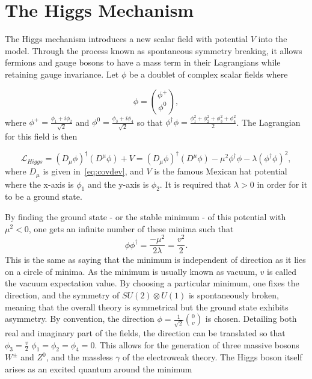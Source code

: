 \section{The Higgs Mechanism}
\label{higgs}
The Higgs mechanism introduces a new scalar field with potential $V$ into the model. Through the process known as spontaneous symmetry breaking, it allows fermions and gauge bosons to have a mass term in their Lagrangians while retaining gauge invariance. Let $\phi$ be a doublet of complex scalar fields where

\begin{equation}
\phi = \binom{\phi^{+}}{\phi^{0}},
\end{equation}
where $\phi^{+} = \frac{\phi_{1} + i{\phi_{2}}}{\sqrt{2}}$ and $\phi^{0} = \frac{\phi_{3} + i{\phi_{4}}}{\sqrt{2}}$ so that $\phi^{\dagger}\phi = \frac{\phi_{1}^{2} + \phi_{2}^{2} + \phi_{3}^{2} + \phi_{4}^{2}}{2}$.  The Lagrangian for this field is then

\begin{equation}
	\mathcal{L}_{Higgs} = (D_{\mu}\phi)^{\dagger}(D^{\mu}\phi) + V = (D_{\mu}\phi)^{\dagger}(D^{\mu}\phi) - \mu^{2}\phi^{\dagger}\phi - \lambda (\phi^{\dagger}\phi)^{2},
\end{equation}
where $D_{\mu}$ is given in~\autoref{eq:covdev}, and $V$ is the famous Mexican hat potential where the x-axis is $\phi_{1}$ and the y-axis is $\phi_{2}$. It is required that $\lambda>0$ in order for it to be a ground state.

By finding the ground state - or the stable minimum - of this potential with $\mu^{2}<0$, one gets an infinite number of these minima such that
\begin{equation}
	\phi\phi^{\dagger}=\frac{-\mu^{2}}{2\lambda}=\frac{v^{2}}{2}.
\end{equation}
This is the same as saying that the minimum is independent of direction as it lies on a circle of minima. As the minimum is usually known as vacuum, $v$ is called the vacuum expectation value. By choosing a particular minimum, one fixes the direction, and the symmetry of $SU(2)\otimes U(1)$ is spontaneously broken, meaning that the overall theory is symmetrical but the ground state exhibits asymmetry. By convention, the direction $\phi=\frac{1}{\sqrt{2}}\binom{0}{v}$ is chosen. Detailing both real and imaginary part of the fields, the direction can be translated so that $\phi_{3}=\frac{v}{2}$ $\phi_{1}=\phi_{2}=\phi_{4}=0$. This allows for the generation of three massive bosons $W^{\pm}$ and $Z^{0}$, and the massless $\gamma$ of the electroweak theory. The Higgs boson itself arises as an excited quantum around the minimum 

